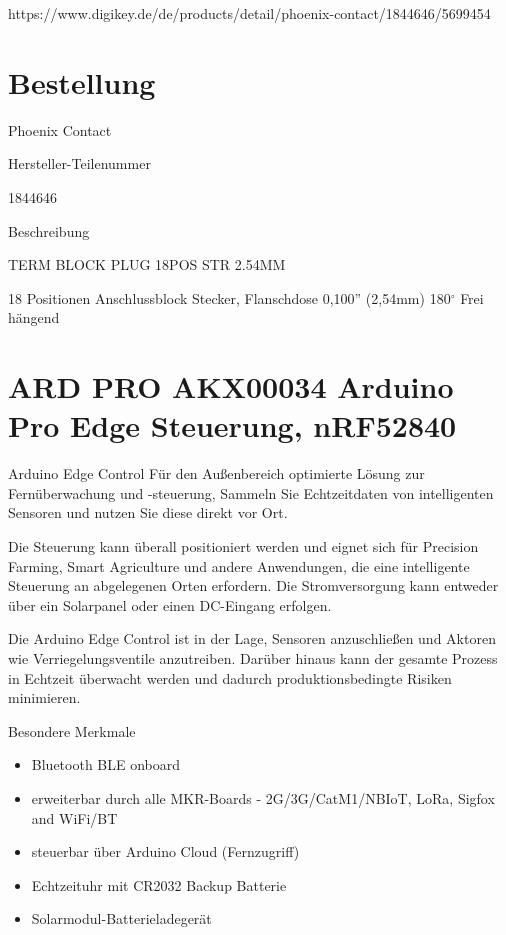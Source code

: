 https://www.digikey.de/de/products/detail/phoenix-contact/1844646/5699454



\section{Bestellung}

Phoenix Contact



Hersteller-Teilenummer

1844646

Beschreibung

TERM BLOCK PLUG 18POS STR 2.54MM

18 Positionen Anschlussblock Stecker, Flanschdose 0,100'' (2,54mm) 180$^\circ$ Frei hängend


\section{ARD PRO AKX00034 Arduino Pro Edge Steuerung, nRF52840}

Arduino Edge Control
Für den Außenbereich optimierte Lösung zur Fernüberwachung und -steuerung,
Sammeln Sie Echtzeitdaten von intelligenten Sensoren und nutzen Sie diese direkt vor Ort.

Die Steuerung kann überall positioniert werden und eignet sich für Precision Farming, Smart Agriculture und andere Anwendungen, die eine intelligente Steuerung an abgelegenen Orten erfordern. Die Stromversorgung kann entweder über ein Solarpanel oder einen DC-Eingang erfolgen.

Die Arduino Edge Control ist in der Lage, Sensoren anzuschließen und Aktoren wie Verriegelungsventile anzutreiben. Darüber hinaus kann der gesamte Prozess in Echtzeit überwacht werden und dadurch produktionsbedingte Risiken minimieren.

\bigskip

Besondere Merkmale

\begin{itemize}
  \item Bluetooth BLE onboard
  \item erweiterbar durch alle MKR-Boards - 2G/3G/CatM1/NBIoT, LoRa, Sigfox and WiFi/BT
  \item steuerbar über Arduino Cloud (Fernzugriff)
  \item Echtzeituhr mit CR2032 Backup Batterie
  \item Solarmodul-Batterieladegerät
\end{itemize}

